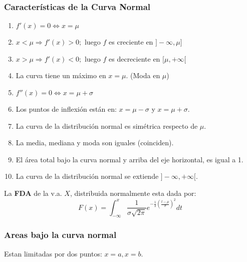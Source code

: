 \subsubsection{Características de la Curva Normal}
\begin{enumerate}
\item $f'(x)=0\Leftrightarrow x=\mu$
\item $x<\mu \Rightarrow f'(x)>0;$ luego $f$ es creciente en $]-\infty,\mu]$
\item $x>\mu \Rightarrow f'(x)<0;$ luego $f$ es decreciente en $[\mu,+\infty[$
\item La curva tiene un máximo en $x=\mu$. (Moda en $\mu$)
\item $f''(x)=0 \Leftrightarrow x = \mu + \sigma$
\item Los puntos de inflexión están en: $x=\mu-\sigma$ y $x=\mu+\sigma$.
\item La curva de la distribución normal es simétrica respecto de $\mu$.
\item La media, mediana y moda son iguales (coinciden).
\item El área total bajo la curva normal y arriba del eje horizontal, es igual a 1.
\item La curva de la distribución normal se extiende $]-\infty,+\infty[$.
\end{enumerate}
La \textbf{FDA} de la v.a. $X$, distribuida normalmente esta dada por:
$$F(x)=
\displaystyle\int_{-\infty}^{x} \dfrac{1}{\sigma \sqrt{2\pi}} e^{-\frac{1}{2} (\frac{t-\mu}{\sigma})^2 } dt
$$

\subsubsection{Areas bajo la curva normal}
Estan limitadas por dos puntos: $x=a,x=b$.


